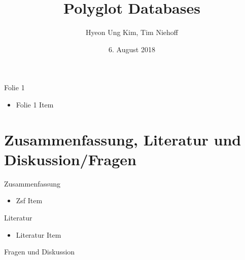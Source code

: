 \documentclass[12pt,usenames,dvipsnames]{beamer}
\title{Polyglot Databases}
\author{Hyeon Ung Kim, Tim Niehoff}
\date{6. August 2018}
\begin{document}
	\maketitle
			
	\begin{frame}{Folie 1}
	\begin{itemize}[<+- | alert@+>]
	\item Folie 1 Item
	\end{itemize}	
	\end{frame}

	\section{Zusammenfassung, Literatur und Diskussion/Fragen}
	\begin{frame}{Zusammenfassung}
	\begin{itemize}[<+- | alert@+>]
	\item Zsf Item
	\end{itemize}
	\end{frame}
	
	\begin{frame}{Literatur}
	\begin{itemize}
		\item Literatur Item
	\end{itemize}
	\end{frame}

\begin{frame}[standout]
  Fragen und Diskussion
\end{frame}
\end{document}
